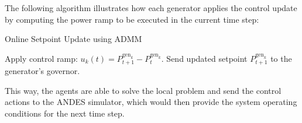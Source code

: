 \documentclass{article}
\begin{document}
The following algorithm illustrates how each generator applies the control update by computing the power ramp to be executed in the current time step:

\begin{algorithm}
\caption{Online Setpoint Update using ADMM}
\begin{algorithmic}
        \State Apply control ramp: $u_k(t) = P^{\text{gen}_k}_{t+1} - P^{\text{gen}_k}_t$.
        \State Send updated setpoint $P^{\text{gen}_k}_{t+1}$ to the generator's governor.
    \EndFor
\end{algorithmic}
\end{algorithm}
This way, the agents are able to solve the local problem and send the control actions to the ANDES simulator, which would then provide the system operating conditions for the next time step.

\newpage
\clearpage
\nocite{*}  
\printbibliography
\end{document}
